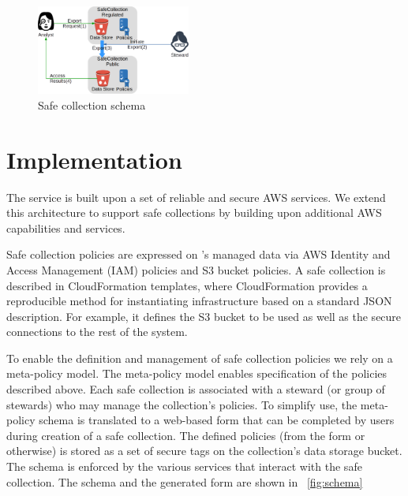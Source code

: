 \begin{figure}
  \center
  \includegraphics[width=0.45\textwidth]{figures/export_flow.png}
  \caption{Safe collection schema}
  \label{fig:flow2}
  \vspace{-1.5em}
\end{figure}



\section{Implementation}

The \NAME service is built upon a set of reliable and secure
AWS services. We extend this architecture to support safe collections
by building upon additional AWS capabilities and services. 

Safe collection policies are expressed on \NAMENS's managed
data via AWS Identity and Access Management (IAM) policies 
and S3 bucket policies.
A safe collection is described in CloudFormation templates, where 
CloudFormation provides a reproducible method for instantiating infrastructure
based on a standard JSON description. For example, it defines
the S3 bucket to be used as well as the secure connections
to the rest of the \NAME system.

To enable the definition and management of safe collection policies we 
rely on a meta-policy model. The meta-policy model enables specification
of the policies described above. Each safe collection is associated with a steward
(or group of stewards) who may manage the collection's policies. To simplify use, the meta-policy schema 
is translated to a web-based form that can be completed by users during creation of a safe collection. 
The defined policies (from the form or otherwise) is stored as a set of secure tags 
on the collection's data storage bucket. The schema is enforced
by the various services that interact with the safe collection. The schema and the generated form are shown in
\figurename~\ref{fig:schema}

